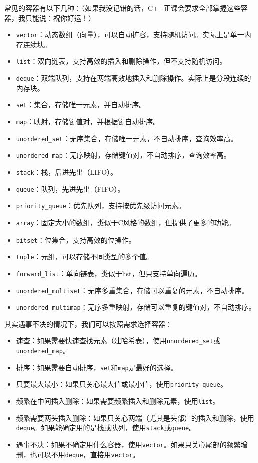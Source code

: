 常见的容器有以下几种：（如果我没记错的话，C++正课会要求全部掌握这些容器，我只能说：祝你好运！）
\begin{itemize}
  \item \texttt{vector}：动态数组（向量），可以自动扩容，支持随机访问。实际上是单一内存连续块。
  \item \texttt{list}：双向链表，支持高效的插入和删除操作，但不支持随机访问。
  \item \texttt{deque}：双端队列，支持在两端高效地插入和删除操作。实际上是分段连续的内存块。
  \item \texttt{set}：集合，存储唯一元素，并自动排序。
  \item \texttt{map}：映射，存储键值对，并根据键自动排序。
  \item \texttt{unordered\_set}：无序集合，存储唯一元素，不自动排序，查询效率高。
  \item \texttt{unordered\_map}：无序映射，存储键值对，不自动排序，查询效率高。
  \item \texttt{stack}：栈，后进先出（LIFO）。
  \item \texttt{queue}：队列，先进先出（FIFO）。
  \item \texttt{priority\_queue}：优先队列，支持按优先级访问元素。
  \item \texttt{array}：固定大小的数组，类似于C风格的数组，但提供了更多的功能。
  \item \texttt{bitset}：位集合，支持高效的位操作。
  \item \texttt{tuple}：元组，可以存储不同类型的多个值。
  \item \texttt{forward\_list}：单向链表，类似于list，但只支持单向遍历。
  \item \texttt{unordered\_multiset}：无序多重集合，存储可以重复的元素，不自动排序。
  \item \texttt{unordered\_multimap}：无序多重映射，存储可以重复的键值对，不自动排序。
\end{itemize}
其实遇事不决的情况下，我们可以按照需求选择容器：
\begin{itemize}
  \item 速查：如果需要快速查找元素（建哈希表），使用\texttt{unordered\_set}或\texttt{unordered\_map}。
  \item 排序：如果需要自动排序，\texttt{set}和\texttt{map}是最好的选择。
  \item 只要最大最小：如果只关心最大值或最小值，使用\texttt{priority\_queue}。
  \item 频繁在中间插入删除：如果需要频繁插入和删除元素，使用\texttt{list}。
  \item 频繁需要两头插入删除：如果只关心两端（尤其是头部）的插入和删除，使用\texttt{deque}。如果能确定用的是栈或队列，使用\texttt{stack}或\texttt{queue}。
  \item 遇事不决：如果不确定用什么容器，使用\texttt{vector}。如果只关心尾部的频繁增删，也可以不用\texttt{deque}，直接用\texttt{vector}。
\end{itemize}

